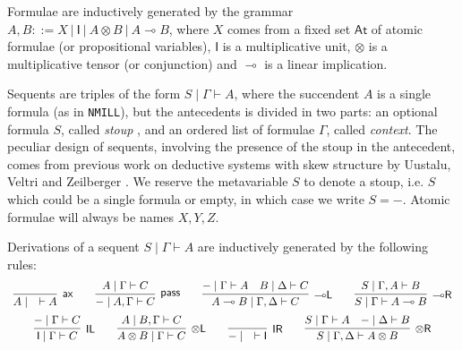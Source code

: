 \documentclass[submission,copyright,creativecommons]{eptcs}
\theoremstyle{definition}
\newtheorem{defn}{Definition}[section]
\newcommand{\tl}{\otimes \mathsf{L}}
\newcommand{\tr}{\otimes \mathsf{R}}
\newcommand{\lright}{{\multimap}\mathsf{R}}
\newcommand{\lleft}{{\multimap}\mathsf{L}}
\newcommand{\pass}{\mathsf{pass}}
\newcommand{\unitl}{\mathsf{IL}}
\newcommand{\unitr}{\mathsf{IR}}
\newcommand{\ax}{\mathsf{ax}}
\newcommand{\ot}{\otimes}
\newcommand{\lolli}{\multimap}
\newcommand{\I}{\mathsf{I}}
\newcommand{\NMILL}{\texttt{NMILL}}
\newcommand{\niccolo}[1]{{\color{red}\textbf{Niccol{\`o}: }#1}}
\begin{document}
Formulae are inductively generated by the grammar $A,B ::= X \ | \ \I \ | \ A \ot B \ | \ A \lolli B$, where $X$ comes from a fixed set $\mathsf{At}$ of atomic formulae (or propositional variables), $\I$ is a multiplicative unit, $\ot$ is a multiplicative tensor (or conjunction) and $\lolli$ is a linear implication. 

Sequents are triples of the form $S \mid \Gamma \vdash A$, where the succendent $A$ is a single formula (as in \NMILL), but the antecedents is divided in two parts: an optional formula $S$, called \emph{stoup} \cite{girard:constructive:91}, and an ordered list of formulae $\Gamma$, called \emph{context}. The peculiar design of sequents, involving the presence of the stoup in the antecedent, comes from previous work on deductive systems with skew structure by Uustalu, Veltri and Zeilberger \cite{uustalu:sequent:2021,uustalu:proof:nodate,uustalu:deductive:nodate,veltri:coherence:2021}.
We reserve the metavariable $S$ to denote a stoup, i.e. $S$ which could be a single formula or empty, in which case we write $S = -$. Atomic formulae will always be names $X,Y,Z$.

Derivations of a sequent $S \mid \Gamma \vdash A$ are inductively generated by the following rules:
\begin{equation}\label{eq:seqcalc}
  \def\arraystretch{2.5}
  \begin{array}{c}
    \infer[\ax]{A \mid \quad \vdash A}{}
    \qquad
    \infer[\pass]{- \mid A , \Gamma \vdash C}{A \mid \Gamma \vdash C}
    \qquad
    \infer[\lleft]{A \lolli B \mid \Gamma , \Delta \vdash C}{
      - \mid \Gamma \vdash A
      &
      B \mid \Delta \vdash C
    }
    \qquad
    \infer[\lright]{S \mid \Gamma \vdash A \lolli B}{S \mid \Gamma , A \vdash B}
    \\
    \infer[\unitl]{\I \mid \Gamma \vdash C}{- \mid \Gamma \vdash C}
    \qquad
    \infer[\tl]{A \ot B \mid \Gamma \vdash C}{A \mid B , \Gamma \vdash C}
    \qquad
    \infer[\unitr]{- \mid \quad \vdash \I}{}
    \qquad
    \infer[\tr]{S \mid \Gamma , \Delta \vdash A \ot B}{
      S \mid \Gamma \vdash A
      &
      - \mid \Delta \vdash B
    }
  \end{array}
\end{equation}


\end{document}

